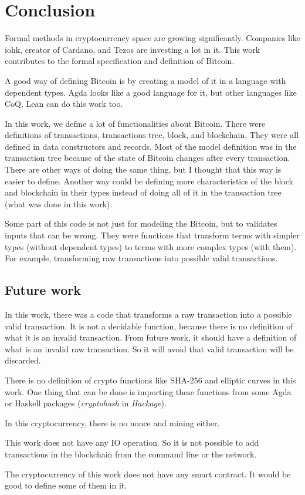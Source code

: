 \section{Conclusion}

Formal methods in cryptocurrency space are growing significantly.
Companies like \gls{iohk}, creator of Cardano, and Tezos are investing a lot in it.
This work contributes to the formal specification and definition of Bitcoin.

A good way of defining Bitcoin is by creating a model of it in a language with dependent types.
Agda looks like a good language for it, but other languages like CoQ, Lean can do this work too.

In this work, we define a lot of functionalities about Bitcoin.
There were definitions of transactions, transactions tree, block, and blockchain.
They were all defined in data constructors and records.
Most of the model definition was in the transaction tree
because of the state of Bitcoin changes after every transaction.
There are other ways of doing the same thing,
but I thought that this way is easier to define.
Another way could be defining more characteristics of the block and blockchain in their
types instead of doing all of it in the transaction tree (what was done in this work).

Some part of this code is not just for modeling the Bitcoin,
but to validates inputs that can be wrong.
They were functions that transform terms with simpler types (without dependent types)
to terms with more complex types (with them).
For example, transforming raw transactions into possible valid transactions.

\subsection{Future work}

In this work, there was a code that transforms a raw transaction into a possible valid transaction.
It is not a decidable function, because there is no definition of what it is an invalid transaction.
From future work, it should have a definition of what is an invalid raw transaction.
So it will avoid that valid transaction will be discarded. 

There is no definition of crypto functions like SHA-256 and elliptic curves in this work.
One thing that can be done is importing these functions from some Agda or Haskell packages
(\emph{cryptohash} in \emph{Hackage}).

In this cryptocurrency, there is no nonce and mining either.

This work does not have any IO operation.
So it is not possible to add transactions in the blockchain from the command line or the network.

The cryptocurrency of this work does not have any smart contract.
It would be good to define some of them in it.
